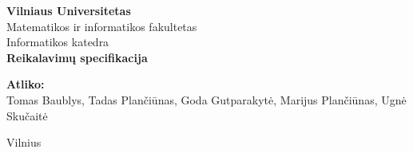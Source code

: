 \documentclass[a4paper]{article}
\begin{document}
\begin{titlepage}
    \centering
    
    {\Large \textbf{Vilniaus Universitetas}}\\[0.2cm]
    {\small Matematikos ir informatikos fakultetas}\\[0.1cm]
    {\small Informatikos katedra}\\[4cm]

    {\huge \textbf{Reikalavimų specifikacija}}\\[4cm]

    \begin{raggedleft}
    \begin{minipage}{0.55\textwidth}
        \textbf{Atliko:}\\
        Tomas Baublys, Tadas Plančiūnas, Goda Gutparakytė, Marijus Plančiūnas, Ugnė Skučaitė\\[0.8cm]
    \end{minipage}
    \end{raggedleft}

    \vfill

    Vilnius \\ \the\year

\end{titlepage}

\pagebreak

\tableofcontents
\pagebreak





\end{document}

